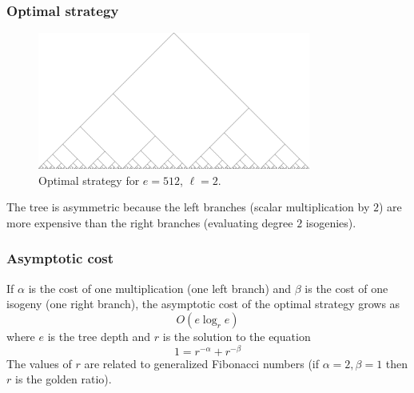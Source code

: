 \documentclass{beamer}
\begin{document}
\begin{frame}
\frametitle{Optimal strategy}
\begin{figure}[t]
  \centering
  \includegraphics[width=0.8\textwidth]{optimal.png}
  \caption{Optimal strategy for $e=512$, $\ell=2$.}
  \label{fig:optimal}
\end{figure}

The tree is asymmetric because the left branches (scalar
multiplication by $2$) are more expensive than the right branches
(evaluating degree $2$ isogenies).
\end{frame}

\begin{frame}
\frametitle{Asymptotic cost}
If $\alpha$ is the cost of one
multiplication (one left branch) and $\beta$ is the cost of one
isogeny (one right branch), the asymptotic cost of the optimal
strategy grows as
\[
    O(e \log_r e)
\]
where $e$ is the tree depth and $r$ is the solution to the equation
\[
   1 = r^{-\alpha} + r^{-\beta}
\]
The values of $r$ are related to generalized Fibonacci numbers (if
$\alpha=2,\beta=1$ then $r$ is the golden ratio).
\end{frame}
\end{document}
